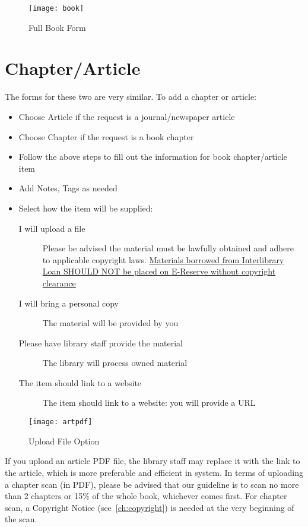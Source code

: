 \clearpage
\begin{figure}[h]
    \centering
    \texttt{[image: book]}
    \caption{Full Book Form}
    \label{fig: book form}
\end{figure}
\clearpage


\section{Chapter/Article}
\label{sec:bchapterandart}
The forms for these two are very similar. To add a chapter or article:
\begin{itemize}
    \item Choose Article if the request is a journal/newspaper article
    \item Choose Chapter if the request is a book chapter
    \item Follow the above steps to fill out the information for book chapter/article item
    \item Add Notes, Tags as needed
    \item Select how the item will be supplied:
        \begin{description}
            \item[I will upload a file] Please be advised the material must be {\imp lawfully obtained and adhere to applicable copyright laws}. \uline{Materials borrowed from Interlibrary Loan SHOULD NOT be placed on E-Reserve without copyright clearance} 
            \item[I will bring a personal copy] The material will be provided by you 
            \item[Please have library staff provide the material] The library will process owned material
            \item[The item should link to a website] The item should link to a website: you will provide a URL
        \end{description}
\end{itemize}

\vspace*{5ex}
\begin{figure}[h]
    \centering
    \texttt{[image: artpdf]}
    \caption{Upload File Option}
    \label{fig:upload artpdf}
\end{figure}

\vspace*{8ex}
\begin{table}[h]
    \centering
    \begin{notebox}
    If you upload an article PDF file, the library staff may replace it with the link to the article, which is more preferable and efficient in \ares system.
    \tcblower
    In terms of uploading a chapter scan (in PDF), please be advised that our guideline is to scan {\imp no more than 2 chapters or 15\% of the whole book, whichever comes first}. For chapter scan, a {\imp Copyright Notice} (see~\autoref{ch:copyright}) is needed at the very beginning of the scan.
    \end{notebox}
    \label{note: guideline}
\end{table}


